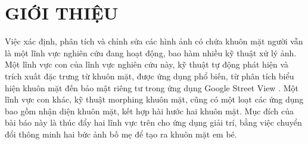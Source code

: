 \documentclass[conference]{IEEEtran}
\begin{document}
\section{GIỚI THIỆU}

Việc xác định, phân tích và chỉnh sửa các hình ảnh có chứa khuôn mặt người vẫn là một lĩnh vực nghiên cứu đang hoạt động, bao hàm nhiều kỹ thuật xử lý ảnh. Một lĩnh vực con của lĩnh vực nghiên cứu này, kỹ thuật tự động phát hiện và trích xuất đặc trưng từ khuôn mặt, được ứng dụng phổ biến, từ phân tích biểu hiện khuôn mặt đến bảo mật riêng tư trong ứng dụng Google Street View \cite{ref:r1}. Một lĩnh vực con khác, kỹ thuật morphing khuôn mặt, cũng có một loạt các ứng dụng bao gồm nhận diện khuôn mặt, kết hợp hài hước hai khuôn mặt. Mục đích của bài báo này là thúc đẩy hai lĩnh vực trên cho ứng dụng giải trí, bằng việc chuyển đổi thông minh hai bức ảnh bố mẹ để tạo ra khuôn mặt em bé.
\end{document}
